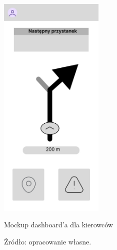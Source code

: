 \begin{figure}
	\centering
	\includegraphics[width=50mm]{images/dashboard.jpg}
	\caption{Mockup dashboard'a dla kierowców}
	\caption*{Źródło: opracowanie własne.}
    \label{fig:dashboard}
\end{figure}